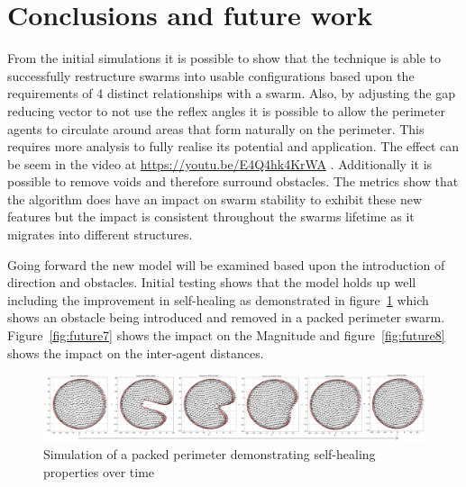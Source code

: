 \documentclass[12pt,a4paper]{IEEEtran}
\begin{document}


\section{Conclusions and future work}\label{conclusions}
From the initial simulations it is possible to show that the technique is able to successfully restructure swarms into usable configurations based upon the requirements of 4 distinct relationships with a swarm. Also, by adjusting the gap reducing vector to not use the reflex angles it is possible to allow the perimeter agents to circulate around areas that form naturally on the perimeter. This requires more analysis to fully realise its potential and application. The effect can be seem in the video at \url{https://youtu.be/E4Q4hk4KrWA} . Additionally it is possible to remove voids and therefore surround obstacles. The metrics show that the algorithm does have an impact on swarm stability to exhibit these new features but the impact is consistent throughout the swarms lifetime as it migrates into different structures.

Going forward the new model will be examined based upon the introduction of direction and obstacles. Initial testing shows that the model holds up well including the improvement in self-healing as demonstrated in figure~\ref{fig:packedSelfHealing} which shows an obstacle being introduced and removed in a packed perimeter swarm. Figure~\ref{fig:future7} shows the impact on the Magnitude and figure~\ref{fig:future8} shows the impact on the inter-agent distances.
\begin{figure}[ht!]
  \begin{center}
    \includegraphics[width=17.6cm]{figures/FutureTime}
  \end{center}
  \caption{Simulation of a packed perimeter demonstrating self-healing properties over time\label{fig:packedSelfHealing}}
\end{figure}
\end{document}
